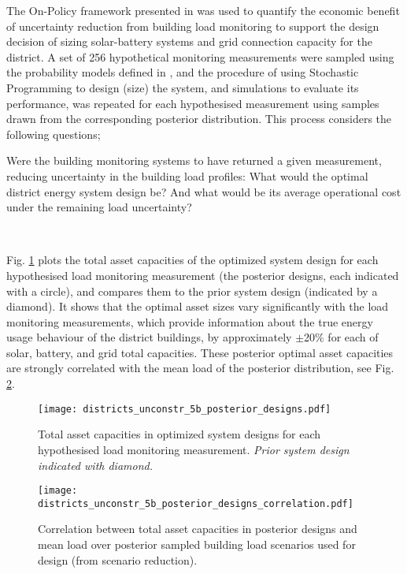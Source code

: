 The On-Policy  framework presented in  was used to quantify the economic benefit of uncertainty reduction from building load monitoring to support the design decision of sizing solar-battery systems and grid connection capacity for the district. A set of 256 hypothetical monitoring measurements were sampled using the probability models defined in , and the procedure of using Stochastic Programming to design (size) the system, and simulations to evaluate its performance, was repeated for each hypothesised measurement using samples drawn from the corresponding posterior distribution. This process considers the following questions;\\

\begin{cbox}[colback=Aquamarine!10!white]{}
    Were the building monitoring systems to have returned a given measurement, reducing uncertainty in the building load profiles: What would the optimal district energy system design be? And what would be its average operational cost under the remaining load uncertainty?
\end{cbox}\

Fig. \ref{fig:districts-posterior-designs} plots the total asset capacities of the optimized system design for each hypothesised load monitoring measurement (the posterior designs, each indicated with a circle), and compares them to the prior system design (indicated by a diamond).
It shows that the optimal asset sizes vary significantly with the load monitoring measurements, which provide information about the true energy usage behaviour of the district buildings, by approximately $\pm$20\% for each of solar, battery, and grid total capacities. These posterior optimal asset capacities are strongly correlated with the mean load of the posterior distribution, see Fig. \ref{fig:districts-posterior-designs-correlation}.

\begin{figure}
    \centering
    \texttt{[image: districts\_unconstr\_5b\_posterior\_designs.pdf]}
    \caption{Total asset capacities in optimized system designs for each hypothesised load monitoring measurement. \textit{Prior system design indicated with diamond.}}
    \label{fig:districts-posterior-designs}
\end{figure}

\begin{figure}
    \centering
        \texttt{[image: districts\_unconstr\_5b\_posterior\_designs\_correlation.pdf]}
        \caption{Correlation between total asset capacities in posterior designs and mean load over posterior sampled building load scenarios used for design (from scenario reduction).}
    \label{fig:districts-posterior-designs-correlation}
\end{figure}

